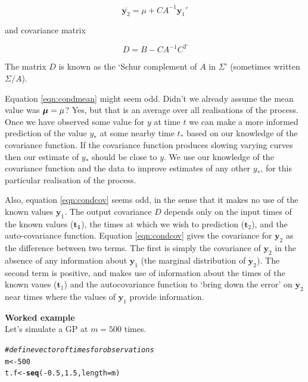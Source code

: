 \documentclass[a4paper, 11pt, amsmath, graphicx]{article}\usepackage[]{graphicx}\usepackage[]{color}
\makeatletter
\newcommand{\hlnum}[1]{\textcolor[rgb]{0.686,0.059,0.569}{#1}}%
\newcommand{\hlcom}[1]{\textcolor[rgb]{0.678,0.584,0.686}{\textit{#1}}}%
\newcommand{\hlopt}[1]{\textcolor[rgb]{0,0,0}{#1}}%
\newcommand{\hlstd}[1]{\textcolor[rgb]{0.345,0.345,0.345}{#1}}%
\newcommand{\hlkwb}[1]{\textcolor[rgb]{0.69,0.353,0.396}{#1}}%
\newcommand{\hlkwc}[1]{\textcolor[rgb]{0.333,0.667,0.333}{#1}}%
\newcommand{\hlkwd}[1]{\textcolor[rgb]{0.737,0.353,0.396}{\textbf{#1}}}%
\newenvironment{kframe}{%
 \def\at@end@of@kframe{}%
 \ifinner\ifhmode%
  \def\at@end@of@kframe{\end{minipage}}%
  \begin{minipage}{\columnwidth}%
 \fi\fi%
 \def\FrameCommand##1{\hskip\@totalleftmargin \hskip-\fboxsep
 \colorbox{shadecolor}{##1}\hskip-\fboxsep
     \hskip-\linewidth \hskip-\@totalleftmargin \hskip\columnwidth}%
 \MakeFramed {\advance\hsize-\width
   \@totalleftmargin\z@ \linewidth\hsize
   \@setminipage}}%
 {\par\unskip\endMakeFramed%
 \at@end@of@kframe}
\newenvironment{knitrout}{}{} %
\def\bmu{{\mbox{\boldmath $\mu$}}}
\makeatother
\begin{document}
\begin{equation}
\label{eqn:condmean}
  \overline{\mathbf{y}_2} = \mu + C A^{-1} \mathbf{y}_1' 
\end{equation}

and covariance matrix 

\begin{equation}
\label{eqn:condcov}
  D = B - CA^{-1} C^T
\end{equation}

The matrix $D$ is known as the `Schur complement of $A$ in $\Sigma$' (sometimes written $\Sigma / A$).

Equation \ref{eqn:condmean} might seem odd. Didn't we already assume the mean value was $\bmu=\mu$? Yes, but that is an average over all realisations of the process. Once we have observed some value for $y$ at time $t$ we can make a more informed prediction of the value $y_*$ at some nearby time $t_*$ based on our knowledge of the covariance function. If the covariance function produces slowing varying curves then our estimate of $y_*$ should be close to $y$. We use our knowledge of the covariance function and the data to improve estimates of any other $y_*$, for this particular realisation of the process. 

Also, equation \ref{eqn:condcov} seems odd, in the sense that it makes no use of the known values $\mathbf{y}_1$. The output covariance $D$ depends only on the input times of the known values ($\mathbf{t_1}$), the times at which we wish to prediction ($\mathbf{t}_2$), and the auto-covariance function. Equation \ref{eqn:condcov} gives the covariance for $\mathbf{y}_2$ as the difference between two terms. The first is simply the covariance of $\mathbf{y}_2$ in the absence of any information about $\mathbf{y}_1$ (the marginal distribution of $\mathbf{y}_2$). The second term is positive, and makes use of information about the times of the known vaues ($\mathbf{t}_1$) and the autocovariance function to `bring down the error' on $\mathbf{y}_2$ near times where the values of $\mathbf{y}_1$ provide information.

\vspace{0.4cm}
\textbf{Worked example}
\\

Let's simulate a GP at $m=500$ times.

\begin{knitrout}
\color{fgcolor}\begin{kframe}
\begin{alltt}
\hlcom{# define vector of times for observations}
\hlstd{m} \hlkwb{<-} \hlnum{500}
\hlstd{t.f} \hlkwb{<-} \hlkwd{seq}\hlstd{(}\hlopt{-}\hlnum{0.5}\hlstd{,} \hlnum{1.5}\hlstd{,} \hlkwc{length} \hlstd{= m)}
\end{alltt}
\end{kframe}
\end{knitrout}
\end{document}

